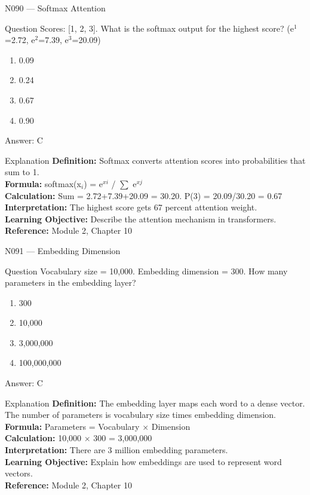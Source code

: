 \documentclass[aspectratio=169,8pt]{beamer}
\begin{document}
	\begin{frame}{N090 --- Softmax Attention}
		\begin{block}{Question}
			Scores: [1, 2, 3]. What is the softmax output for the highest score? (e$^{1}$=2.72, e$^{2}$=7.39, e$^{3}$=20.09)
			\begin{enumerate}
				\item 0.09
				\item 0.24
				\item 0.67
				\item 0.90
			\end{enumerate}
		\end{block}
		\begin{exampleblock}{Answer: C}\end{exampleblock}
		\begin{block}{Explanation}
			\textbf{Definition:} Softmax converts attention scores into probabilities that sum to 1.\\
			\textbf{Formula:} softmax(x$_{i}$) = e$^{xi}$ / $\sum$ e$^{xj}$\\
			\textbf{Calculation:} Sum = 2.72+7.39+20.09 = 30.20. P(3) = 20.09/30.20 = 0.67\\
			\textbf{Interpretation:} The highest score gets 67 percent attention weight.\\
			\textbf{Learning Objective:} Describe the attention mechanism in transformers.\\
			\textbf{Reference:} Module 2, Chapter 10
		\end{block}
	\end{frame}
	
	\begin{frame}{N091 --- Embedding Dimension}
		\begin{block}{Question}
			Vocabulary size = 10,000. Embedding dimension = 300. How many parameters in the embedding layer?
			\begin{enumerate}
				\item 300
				\item 10,000
				\item 3,000,000
				\item 100,000,000
			\end{enumerate}
		\end{block}
		\begin{exampleblock}{Answer: C}\end{exampleblock}
		\begin{block}{Explanation}
			\textbf{Definition:} The embedding layer maps each word to a dense vector. The number of parameters is vocabulary size times embedding dimension.\\
			\textbf{Formula:} Parameters = Vocabulary $\times$ Dimension\\
			\textbf{Calculation:} 10,000 $\times$ 300 = 3,000,000\\
			\textbf{Interpretation:} There are 3 million embedding parameters.\\
			\textbf{Learning Objective:} Explain how embeddings are used to represent word vectors.\\
			\textbf{Reference:} Module 2, Chapter 10
		\end{block}
	\end{frame}
	
\end{document}
